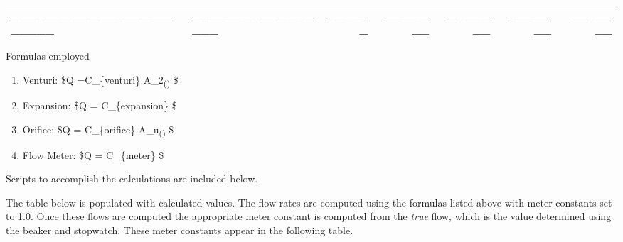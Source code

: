 \documentclass[11pt]{article}
\providecommand{\tightlist}{%
      \setlength{\itemsep}{0pt}\setlength{\parskip}{0pt}}
\begin{document}
\begin{longtable}[]{@{}llrrrrr@{}}
\begin{minipage}[t]{0.27\columnwidth}\raggedright
\_\_\_\_\_\_\_\_\_\_\_\_\_\_\_\_\_\_\_\_\_\_\_\_\strut
\end{minipage} & \begin{minipage}[t]{0.19\columnwidth}\raggedright
\_\_\_\_\_\_\_\_\_\_\_\_\_\_\_\_\_\strut
\end{minipage} & \begin{minipage}[t]{0.07\columnwidth}\raggedleft
\_\_\_\_\_\_\strut
\end{minipage} & \begin{minipage}[t]{0.07\columnwidth}\raggedleft
\_\_\_\_\_\_\_\strut
\end{minipage} & \begin{minipage}[t]{0.07\columnwidth}\raggedleft
\_\_\_\_\_\_\_\strut
\end{minipage} & \begin{minipage}[t]{0.07\columnwidth}\raggedleft
\_\_\_\_\_\_\_\strut
\end{minipage} & \begin{minipage}[t]{0.07\columnwidth}\raggedleft
\_\_\_\_\_\_\_\strut
\end{minipage}\tabularnewline
\bottomrule
\end{longtable}

Formulas employed

\begin{enumerate}
\def\labelenumi{\arabic{enumi}.}
\tightlist
\item
  Venturi: \$Q =C\_\{venturi\}
  A\_2\textsubscript{()}
  \$
\item
  Expansion: \$Q = C\_\{expansion\}
   \$
\item
  Orifice: \$Q = C\_\{orifice\}
  A\_u\textsubscript{()}
  \$
\item
  Flow Meter: \$Q = C\_\{meter\}
   \$
\end{enumerate}

Scripts to accomplish the calculations are included below.

The table below is populated with calculated values. The flow rates are
computed using the formulas listed above with meter constants set to
1.0. Once these flows are computed the appropriate meter constant is
computed from the \emph{true} flow, which is the value determined using
the beaker and stopwatch. These meter constants appear in the following
table.
\end{document}
